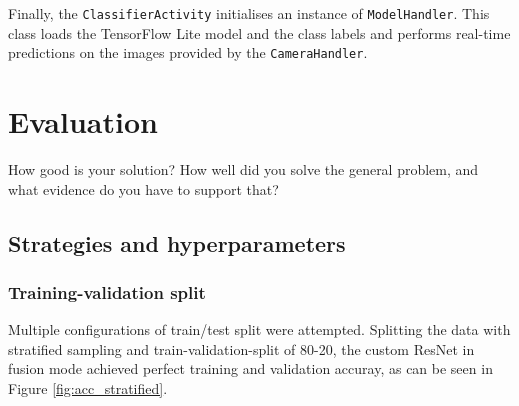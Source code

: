 \documentclass{l4proj}
\begin{document}
Finally, the \lstinline{ClassifierActivity} initialises an instance of \lstinline{ModelHandler}. This class loads the TensorFlow Lite model and the class labels and performs real-time predictions on the images provided by the \lstinline{CameraHandler}.




\chapter{Evaluation} 
How good is your solution? How well did you solve the general problem, and what evidence do you have to support that?

\section{Strategies and hyperparameters}

\subsection{Training-validation split}
\label{eval_train_val_split}

Multiple configurations of train/test split were attempted. Splitting the data with stratified sampling and train-validation-split of 80-20, the custom ResNet in fusion mode achieved perfect training and validation accuray, as can be seen in Figure \ref{fig:acc_stratified}.  
\end{document}
